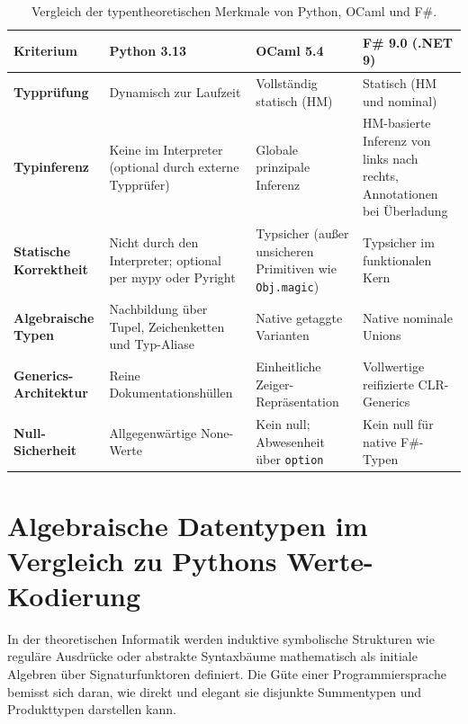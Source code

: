 \begin{table}[htbp]
  \centering
  \small
  \caption{Vergleich der typentheoretischen Merkmale von Python, OCaml und F\#.}
  \label{tab:type_system_comparison}
  \begin{tabularx}{\textwidth}{lXXX}
    \toprule
    \textbf{Kriterium} & \textbf{Python 3.13} & \textbf{OCaml 5.4} & \textbf{F\# 9.0 (.NET 9)} \\
    \midrule
    \textbf{Typprüfung} & Dynamisch zur Laufzeit & Vollständig statisch (HM) & Statisch (HM und nominal) \\
    \addlinespace[3pt]
    \textbf{Typinferenz} & Keine im Interpreter (optional durch externe Typprüfer) & Globale prinzipale Inferenz & HM-basierte Inferenz von links nach rechts, Annotationen bei Überladung \\
    \addlinespace[3pt]
    \textbf{Statische Korrektheit} & Nicht durch den Interpreter; optional per mypy oder Pyright & Typsicher (außer unsicheren Primitiven wie \texttt{Obj.magic}) & Typsicher im funktionalen Kern \\
    \addlinespace[3pt]
    \textbf{Algebraische Typen} & Nachbildung über Tupel, Zeichenketten und Typ-Aliase & Native getaggte Varianten & Native nominale Unions \\
    \addlinespace[3pt]
    \textbf{Generics-Architektur} & Reine Dokumentationshüllen & Einheitliche Zeiger-Repräsentation & Vollwertige reifizierte CLR-Generics \\
    \addlinespace[3pt]
    \textbf{Null-Sicherheit} & Allgegenwärtige None-Werte & Kein null; Abwesenheit über \texttt{option} & Kein null für native F\#-Typen \\
    \bottomrule
  \end{tabularx}
\end{table}

\section{Algebraische Datentypen im Vergleich zu Pythons Werte-Kodierung}
\label{sec:adts_vs_classes}

In der theoretischen Informatik werden induktive symbolische Strukturen wie reguläre Ausdrücke oder abstrakte Syntaxbäume mathematisch als initiale Algebren über Signaturfunktoren definiert.
Die Güte einer Programmiersprache bemisst sich daran, wie direkt und elegant sie disjunkte Summentypen und Produkttypen darstellen kann.

